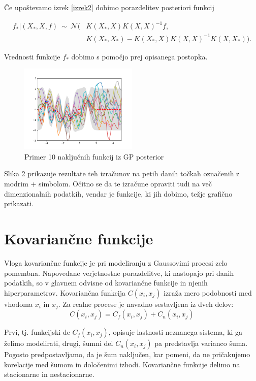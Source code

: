 \documentclass[12pt,a4paper]{amsart}
\theoremstyle{definition} %
\theoremstyle{plain} %
\begin{document}
Če upoštevamo izrek \ref{izrek2} dobimo porazdelitev posteriori funkcij

\begin{equation}
\begin{split}
f_{*} |( X_{*}, X, f ) ~ \sim ~ \mathcal{N} ( &K(X_{*},X) K(X,X)^{-1} f, \\
& K(X_{*},X_{*}) - K(X_{*},X)K(X,X)^{-1}K(X,X_{*})).
\end{split}
\end{equation}

Vrednosti funkcije $f_{*}$ dobimo s pomočjo prej opisanega postopka. 

\begin{figure}[h]
\caption{Primer 10 naključnih funkcij iz GP posterior}
\centering
\includegraphics[width=0.5\textwidth]{10posterior}
\end{figure}

\opomba Slika 2 prikazuje rezultate teh izračunov na petih danih točkah označenih z modrim + simbolom. 
Očitno se da te izračune opraviti tudi na več dimenzionalnih podatkih, vendar je funkcije, ki jih dobimo, težje grafično prikazati.


\section{Kovariančne funkcije}
Vloga kovariančne funkcije je pri modeliranju z Gaussovimi procesi zelo pomembna. Napovedane verjetnostne porazdelitve, ki nastopajo pri danih podatkih, so v glavnem odvisne od kovariančne funkcije in njenih hiperparametrov.
Kovariančna funkcija $C(x_{i}, x_{j})$ izraža mero podobnosti med vhodoma $x_{i}$ in $x_{j}$. Za realne procese je navadno sestavljena iz dveh delov:
\begin{equation}
C(x_{i}, x_{j}) = C_{f}(x_{i}, x_{j}) + C_{n}(x_{i}, x_{j})
\end{equation}

Prvi, tj. funkcijski de $C_{f}(x_{i}, x_{j})$, opisuje lastnosti neznanega sistema, ki ga želimo modelirati, drugi, šumni del $C_{n}(x_{i}, x_{j})$ pa predstavlja varianco šuma. Pogosto predpostavljamo, da je šum naključen, kar pomeni, da ne pričakujemo korelacije med šumom in določenimi izhodi. Kovariančne funkcije delimo na stacionarne in nestacionarne. 
\end{document}
